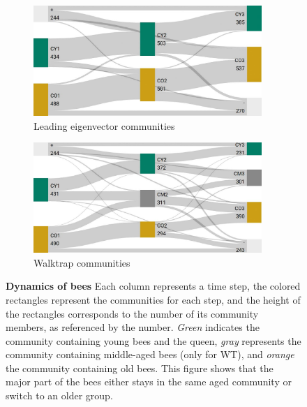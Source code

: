 \begin{figure}[htb]
	\centering
	\begin{subfigure}[b]{0.49\textwidth}
	\centering
	\includegraphics[width=0.95\textwidth]{Figures/LE_matching}
	\caption[Leading eigenvector communities]{Leading eigenvector communities}
	\label{fig:membersLE}
	\vspace*{5mm}
	\end{subfigure} 
	\begin{subfigure}[b]{0.49\textwidth}
	\centering
	\includegraphics[width=0.95\textwidth]{Figures/WT_matching}
	\caption[Walktrap communities]{Walktrap communities}
	\label{fig:membersWT}
	\vspace*{5mm}
	\end{subfigure}
	\caption[Dynamics of bees]{\textbf{Dynamics of bees} 
	Each column represents a time step, the colored rectangles represent the communities for each step, and the height of the rectangles corresponds to the number of its community members, as referenced by the number. \emph{Green} indicates the community containing young bees and the queen, \emph{gray} represents the community containing middle-aged bees (only for WT), and \emph{orange} the community containing old bees. This figure shows that the major part of the bees either stays in the same aged community or switch to an older group.}
	\label{fig:members}
\end{figure}
